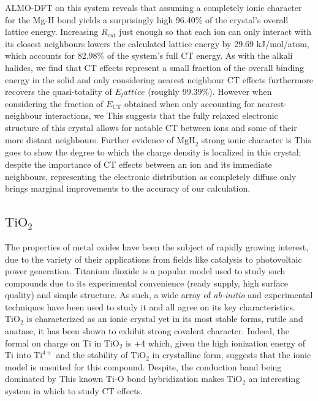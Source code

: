 \documentclass[aps,prb,twocolumn,amsmath,amssymb,superscriptaddress,longbibliography]{revtex4-1}
\begin{document}
ALMO-DFT on this system reveals that assuming a completely ionic character for the Mg-H bond yields a surprisingly high 96.40\% of the crystal's overall lattice energy.  
Increasing $R_{cut}$ just enough so that each ion can only interact with its closest neighbours lowers the calculated lattice energy by 29.69 kJ/mol/atom, which accounts for 82.98\% of the system's full CT energy.
As with the alkali halides, we find that CT effects represent a small fraction of the overall binding energy in the solid and only considering nearest neighbour CT effects furthermore recovers the quasi-totality of $E_lattice$ (roughly 99.39\%).
However when considering the fraction of $E_{\text{CT}}$ obtained when only accounting for nearest-neighbour interactions, we
This suggests that the fully relaxed electronic structure of this crystal allows for notable CT between ions and some of their more distant neighbours.
Further evidence of $\text{MgH}_{2}$ strong ionic character is  
This goes to show the degree to which the charge density is localized in this crystal; despite the importance of CT effects between an ion and its immediate neighbours, representing the electronic distribution as completely diffuse only brings marginal improvements to the accuracy of our calculation. 


\subsection*{$\text{TiO}_{2}$}


The properties of metal oxides have been the subject of rapidly growing interest, due to the variety of their applications from fields like catalysis to photovoltaic power generation. 
Titanium dioxide is a popular model used to study such compounds due to its experimental convenience (ready supply, high surface quality) and simple structure.
As such, a wide array of \emph{ab-initio} and experimental techniques have been used to study it and all agree on its key characteristics.
$\text{TiO}_{2}$ is characterized as an ionic crystal yet in its most stable forms, rutile and anatase, it has been shown to exhibit strong covalent character\cite{}.
Indeed, the formal on charge on Ti in $\text{TiO}_{2}$ is +4 which, given the high ionization energy of Ti into $\text{Ti}^{4+}$ and the stability of $\text{TiO}_{2}$ in crystalline form, suggests that the ionic model is unsuited for this compound.
Despite, the conduction band being dominated by 
This known Ti-O bond hybridization makes $\text{TiO}_{2}$ an interesting system in which to study CT effects. \\
\end{document}
